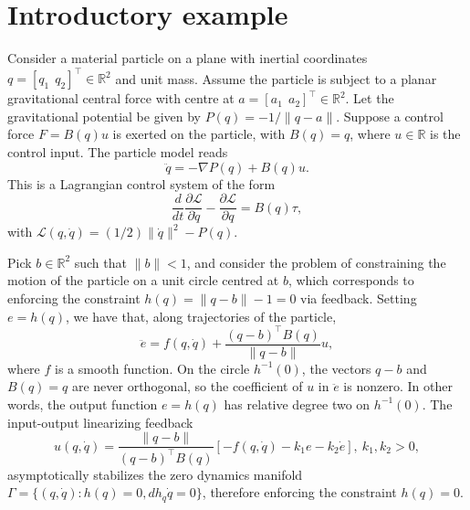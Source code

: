 \section{Introductory example}\label{sec:introductory_example}

Consider a material particle on a plane with inertial coordinates
$q=[q_1 \ \ q_2]^\top \in \mathbb{R}^2$ and unit mass. Assume the particle
is subject to a planar gravitational central force with centre at
$a=[a_1 \ \ a_2]^\top \in \mathbb{R}^2$. Let the gravitational potential be
given by $P(q)=-1 / \|q - a\|$. Suppose a control force $F= B(q) u$ is
exerted on the particle, with $B(q)= q$, where $u \in \mathbb{R}$ is the
control input. The particle model reads
\begin{equation}\label{eq:particle_model}
\ddot q = -\nabla P(q) + B(q) u.
\end{equation}
This is a Lagrangian control system of the form 
\begin{equation}\label{eq:Lagrangian_control_sys}
{\frac{d}{dt}\frac{\partial{{\mathcal{L}}}}{\partial\dot{{q}}}-
	\frac{\partial{{\mathcal{L}}}}{\partial {q}}}=B(q)\tau,
\end{equation}
with $\mathcal{L}(q,\dot q) = (1/2) \|\dot q\|^2 - P(q)$.

Pick $b \in \mathbb{R}^2$ such that $\|b\|<1$, and consider the problem of
constraining the motion of the particle on a unit circle centred at
$b$, which corresponds to enforcing the constraint $h(q) = \|q -
b\|-1=0$ via feedback. Setting $e = h(q)$, we have that, along
trajectories of the particle, 
\[
\ddot e = f(q,\dot q) + \frac{ (q-b)^\top B(q)}{\|q-b\|} u,
\]
where $f$ is a smooth function. On the circle $h^{-1}(0)$, the vectors
$q-b$ and $B(q)=q$ are never orthogonal, so the coefficient of $u$ in
$\ddot e$ is nonzero. In other words, the output function $e = h(q)$
has relative degree two on $h^{-1}(0)$. The input-output linearizing
feedback
\[
u(q,\dot q) = \frac{\|q-b\|}{(q-b)^\top B(q)}[-f(q,\dot q) - k_1
e - k_2 \dot e], \ k_1,k_2>0,
\]
asymptotically stabilizes the zero dynamics manifold $\Gamma =
\{(q,\dot q): h(q)=0, d h_q \dot q =0\}$, therefore enforcing the
constraint $h(q)=0$.

